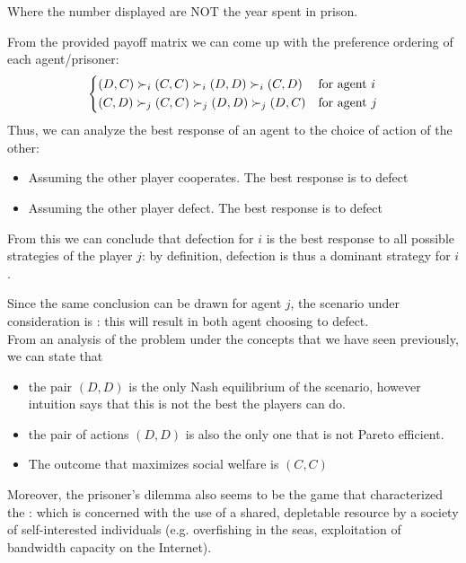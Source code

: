 	Where the number displayed are NOT the year spent in prison.
	
	From the provided payoff matrix we can come up with the preference ordering of each agent/prisoner:
	\[
	\begin{dcases}
	(D,C) \succ_i (C,C) \succ_i (D,D) \succ_i (C,D) & \text{for agent }i\\
	(C,D) \succ_j (C,C) \succ_j (D,D) \succ_j (D,C) & \text{for agent }j\\
	\end{dcases}
	\]
	Thus, we can analyze the best response of an agent to the choice of action of the other:
	\begin{itemize}
	\item Assuming the other player cooperates. The best response is to defect
	\item Assuming the other player defect. The best response is to defect
	\end{itemize}
	From this we can conclude that defection for $i$ is the best response to all possible strategies of the player $j$: by definition, defection is thus a dominant strategy for $i$.
	
	Since the same conclusion can be drawn for agent $j$, the scenario under consideration is : this will result in both agent choosing to defect.\\
	From an analysis of the problem under the concepts that we have seen previously, we can state that
	\begin{itemize}
	\item the pair $(D,D)$ is the only Nash equilibrium of the scenario, however intuition says that this is not the best the players can do. 		\item the pair of actions $(D,D)$ is also the only one that is not Pareto efficient. 
	\item The outcome that maximizes social welfare is $(C,C)$
	\end{itemize}
	
	 \cite{mastxt}
	
	Moreover, the prisoner’s dilemma also seems to be the game that characterized the : which is concerned with the use of a shared, depletable resource by a society of self-interested individuals (e.g. overfishing in the seas, exploitation of bandwidth capacity on the Internet).
	
